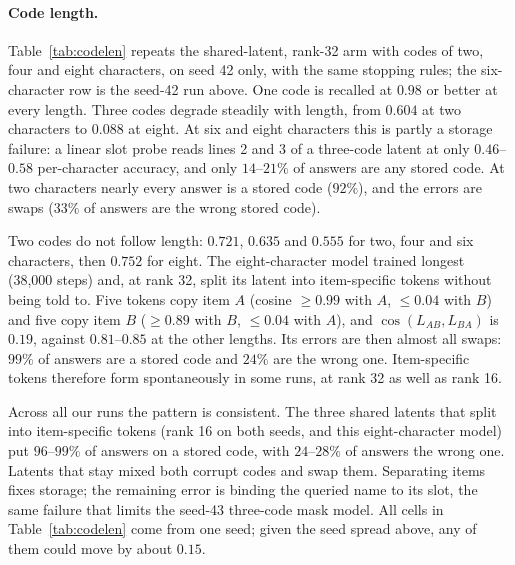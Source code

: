 \paragraph{Code length.} Table~\ref{tab:codelen} repeats the shared-latent, rank-32 arm with codes of two, four and eight characters, on seed 42 only, with the same stopping rules; the six-character row is the seed-42 run above. One code is recalled at $0.98$ or better at every length. Three codes degrade steadily with length, from $0.604$ at two characters to $0.088$ at eight. At six and eight characters this is partly a storage failure: a linear slot probe reads lines 2 and 3 of a three-code latent at only $0.46$--$0.58$ per-character accuracy, and only $14$--$21\%$ of answers are any stored code. At two characters nearly every answer is a stored code ($92\%$), and the errors are swaps ($33\%$ of answers are the wrong stored code).

Two codes do not follow length: $0.721$, $0.635$ and $0.555$ for two, four and six characters, then $0.752$ for eight. The eight-character model trained longest (38{,}000 steps) and, at rank 32, split its latent into item-specific tokens without being told to. Five tokens copy item $A$ (cosine $\geq0.99$ with $A$, $\leq0.04$ with $B$) and five copy item $B$ ($\geq0.89$ with $B$, $\leq0.04$ with $A$), and $\cos(L_{AB},L_{BA})$ is $0.19$, against $0.81$--$0.85$ at the other lengths. Its errors are then almost all swaps: $99\%$ of answers are a stored code and $24\%$ are the wrong one. Item-specific tokens therefore form spontaneously in some runs, at rank 32 as well as rank 16.

Across all our runs the pattern is consistent. The three shared latents that split into item-specific tokens (rank 16 on both seeds, and this eight-character model) put $96$--$99\%$ of answers on a stored code, with $24$--$28\%$ of answers the wrong one. Latents that stay mixed both corrupt codes and swap them. Separating items fixes storage; the remaining error is binding the queried name to its slot, the same failure that limits the seed-43 three-code mask model. All cells in Table~\ref{tab:codelen} come from one seed; given the seed spread above, any of them could move by about $0.15$.


